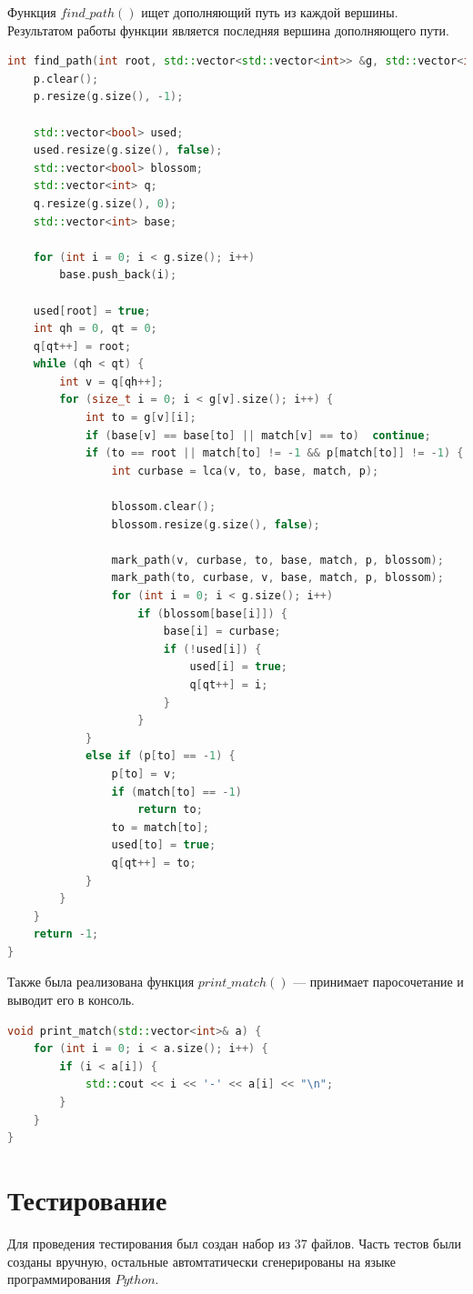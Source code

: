 \documentclass[14pt, a4paper]{extarticle}
\begin{document}
    Функция $find\_path()$ ищет дополняющий путь из каждой вершины. Результатом работы функции является последняя вершина дополняющего пути.

    \begin{lstlisting}[language=c++]
int find_path(int root, std::vector<std::vector<int>> &g, std::vector<int> &match, std::vector<int>& p) {
	p.clear();
	p.resize(g.size(), -1);

	std::vector<bool> used;
	used.resize(g.size(), false);
	std::vector<bool> blossom;
	std::vector<int> q;
	q.resize(g.size(), 0);
	std::vector<int> base;

	for (int i = 0; i < g.size(); i++)
		base.push_back(i);

	used[root] = true;
	int qh = 0, qt = 0;
	q[qt++] = root;
	while (qh < qt) {
		int v = q[qh++];
		for (size_t i = 0; i < g[v].size(); i++) {
			int to = g[v][i];
			if (base[v] == base[to] || match[v] == to)  continue;
			if (to == root || match[to] != -1 && p[match[to]] != -1) {
				int curbase = lca(v, to, base, match, p);
				
				blossom.clear();
				blossom.resize(g.size(), false);

				mark_path(v, curbase, to, base, match, p, blossom);
				mark_path(to, curbase, v, base, match, p, blossom);
				for (int i = 0; i < g.size(); i++)
					if (blossom[base[i]]) {
						base[i] = curbase;
						if (!used[i]) {
							used[i] = true;
							q[qt++] = i;
						}
					}
			}
			else if (p[to] == -1) {
				p[to] = v;
				if (match[to] == -1)
					return to;
				to = match[to];
				used[to] = true;
				q[qt++] = to;
			}
		}
	}
	return -1;
}
    \end{lstlisting}

    Также была реализована функция $print\_match()$ --- принимает паросочетание и выводит его в консоль.

    \begin{lstlisting}[language=c++]
void print_match(std::vector<int>& a) {
	for (int i = 0; i < a.size(); i++) {
		if (i < a[i]) {
			std::cout << i << '-' << a[i] << "\n";
		}
	}
}
    \end{lstlisting}
    
    \pagebreak

    \section*{Тестирование}

     Для проведения тестирования был создан набор из 37 файлов. Часть тестов были созданы вручную, остальные автомтатически сгенерированы на языке программирования $Python$.
\end{document}
